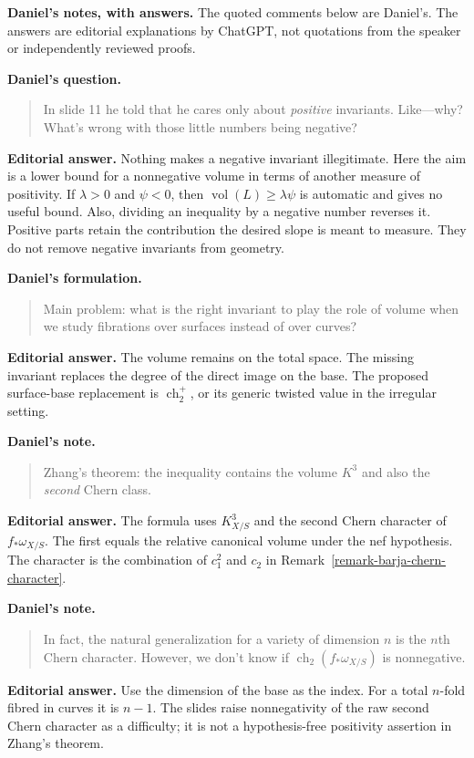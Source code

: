\medskip\noindent
{\bf Daniel's notes, with answers.}
The quoted comments below are Daniel's.
The answers are editorial explanations by
ChatGPT, not quotations from the speaker
or independently reviewed proofs.

\begin{remark}
\label{remark-barja-daniel-positivity}
{\bf Daniel's question.}
\begin{quote}
In slide 11 he told that he cares only
about \emph{positive} invariants.
Like---why? What's wrong with those little
numbers being negative?
\end{quote}
{\bf Editorial answer.}
Nothing makes a negative invariant
illegitimate. Here the aim is a lower
bound for a nonnegative volume in terms
of another measure of positivity.
If $\lambda>0$ and $\psi<0$, then
$\operatorname{vol}(L)\geq\lambda\psi$
is automatic and gives no useful bound.
Also, dividing an inequality by a negative
number reverses it. Positive parts retain
the contribution the desired slope is
meant to measure. They do not remove
negative invariants from geometry.
\end{remark}

\begin{remark}
\label{remark-barja-daniel-main-problem}
{\bf Daniel's formulation.}
\begin{quote}
Main problem: what is the right invariant
to play the role of volume when we study
fibrations over surfaces instead of over
curves?
\end{quote}
{\bf Editorial answer.}
The volume remains on the total space.
The missing invariant replaces the degree
of the direct image on the base. The
proposed surface-base replacement is
$\operatorname{ch}_2^+$, or its generic
twisted value in the irregular setting.
\end{remark}

\begin{remark}
\label{remark-barja-daniel-zhang}
{\bf Daniel's note.}
\begin{quote}
Zhang's theorem: the inequality contains
the volume $K^3$ and also the
\emph{second} Chern class.
\end{quote}
{\bf Editorial answer.}
The formula uses $K_{X/S}^3$ and the second
Chern character of $f_*\omega_{X/S}$.
The first equals the relative canonical
volume under the nef hypothesis.
The character is the combination of
$c_1^2$ and $c_2$ in
Remark~\ref{remark-barja-chern-character}.
\end{remark}

\begin{remark}
\label{remark-barja-daniel-index}
{\bf Daniel's note.}
\begin{quote}
In fact, the natural generalization for a
variety of dimension $n$ is the $n$th
Chern character. However, we don't know
if $\operatorname{ch}_2
(f_*\omega_{X/S})$ is nonnegative.
\end{quote}
{\bf Editorial answer.}
Use the dimension of the base as the
index. For a total $n$-fold fibred in
curves it is $n-1$.
The slides raise nonnegativity of the raw
second Chern character as a difficulty;
it is not a hypothesis-free positivity
assertion in Zhang's theorem.
\end{remark}

